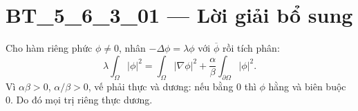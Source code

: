 \documentclass[10pt,a4paper]{article}
\begin{document}
\section*{BT\_5\_6\_3\_01 — Lời giải bổ sung}
Cho hàm riêng phức $\phi\ne0$, nhân $-\Delta\phi=\lambda\phi$ với $\overline\phi$ rồi tích phân:
\[\lambda\int_\Omega|\phi|^2=\int_\Omega|\nabla\phi|^2+\frac\alpha\beta\int_{\partial\Omega}|\phi|^2.\]
Vì $\alpha\beta>0$, $\alpha/\beta>0$, vế phải thực và dương: nếu bằng 0 thì $\phi$ hằng và biên buộc 0. Do đó mọi trị riêng thực dương.
\end{document}

